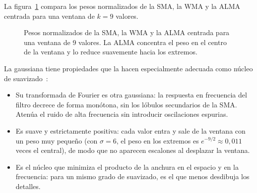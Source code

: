 \documentclass[11pt,a4paper]{article}
\begin{document}
La figura~\ref{fig:pesos} compara los pesos normalizados de la SMA, la WMA y la
ALMA centrada para una ventana de $k = 9$ valores.

\begin{figure}[ht]
    \centering
    \caption{Pesos normalizados de la SMA, la WMA y la ALMA centrada para una
             ventana de 9 valores. La ALMA concentra el peso en el centro de la
             ventana y lo reduce suavemente hacia los extremos.}
    \label{fig:pesos}
\end{figure}

La gaussiana tiene propiedades que la hacen especialmente adecuada como núcleo
de suavizado~\cite{haddad}:
\begin{itemize}
    \item Su transformada de Fourier es otra gaussiana: la respuesta en
          frecuencia del filtro decrece de forma monótona, sin los lóbulos
          secundarios de la SMA. Atenúa el ruido de alta frecuencia sin
          introducir oscilaciones espurias.
    \item Es suave y estrictamente positiva: cada valor entra y sale de la
          ventana con un peso muy pequeño (con $\sigma = 6$, el peso en los
          extremos es $e^{-9/2} \approx 0{,}011$ veces el central), de modo que
          no aparecen escalones al desplazar la ventana.
    \item Es el núcleo que minimiza el producto de la anchura en el espacio y
          en la frecuencia: para un mismo grado de suavizado, es el que menos
          desdibuja los detalles.
\end{itemize}
\end{document}

